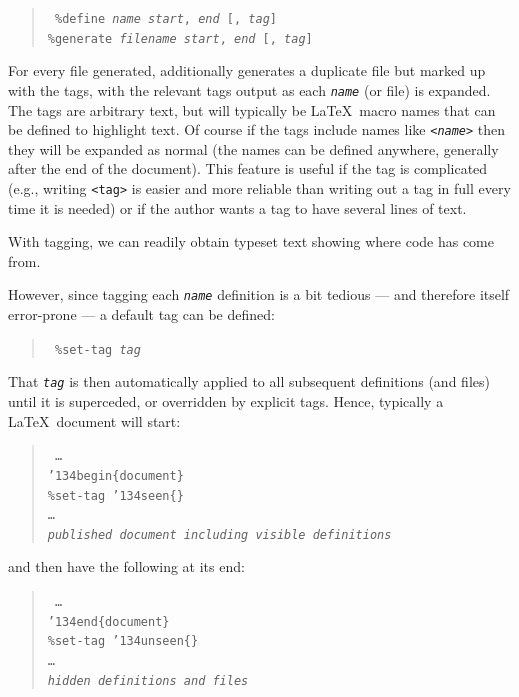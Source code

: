\documentclass[prodmode,acmtecs]{acmsmall} %
\begin{document}
\begin{verse}\tt
\%{}define \emph{name} \emph{start}, \emph{end} [, \emph{tag}] \\
\%{}generate \emph{filename} \emph{start}, \emph{end} [, \emph{tag}]
\end{verse} 

For every file generated,  additionally generates a duplicate file but marked up with the tags, with the relevant tags output as each \texttt{\emph{name}} (or file) is expanded. The tags are arbitrary text, but will typically be \LaTeX\ macro names that can be defined to highlight text. Of course if the tags include names like \texttt{<\emph{name}>} then they will be expanded as normal (the names can be defined anywhere, generally after the end of the document). This feature is useful if the tag is complicated (e.g., writing \texttt{<tag>} is easier and more reliable than writing out a tag in full every time it is needed) or if the author wants a tag to have several lines of text.

With tagging, we can readily obtain typeset text showing where code has come from. 

However, since tagging each \texttt{\emph{name}} definition is a bit tedious --- and therefore itself error-prone --- a default tag can be defined:

\begin{verse}\tt
\%{}set-tag \emph{tag} \\
\end{verse}

That \texttt{\emph{tag}} is then automatically applied to all subsequent definitions (and files) until it is superceded, or overridden by explicit tags. Hence, typically a \LaTeX\ document will start:

\begin{verse}\tt
\ldots \\
\char'134begin\{document\}\\
\%{}set-tag \char'134seen\{\} \\
\ldots \\
\emph{published document including visible definitions}
\end{verse}

and then have the following at its end:

\begin{verse}\tt
\ldots\\
\char'134end\{document\} \\
\%{}set-tag \char'134unseen\{\} \\
\ldots\\
\emph{hidden definitions and files}
\end{verse}
\end{document}
